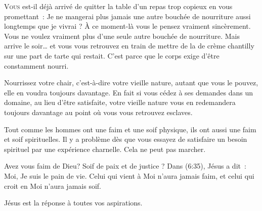 
\lettrine{V}{ous} est-il déjà arrivé de quitter la table d'un repas
 trop copieux en vous promettant~:
 \og Je ne mangerai plus jamais une autre bouchée de nourriture aussi longtemps
 que je vivrai \fg{} ?
 \`A ce moment-là vous le pensez vraiment sincèrement.
 Vous ne voulez vraiment plus d'une seule autre bouchée de nourriture.
 Mais arrive le soir\dots{} et vous vous retrouvez en train de mettre
 de la de crème chantilly sur une part de tarte qui restait.
 C'est parce que le corps exige d'être constamment nourri.


Nourrissez votre chair, c'est-à-dire votre vieille nature,
 autant que vous le pouvez, elle en voudra toujours davantage.
 En fait si vous cédez à ses demandes dans un domaine,
 au lieu d'être satisfaite, votre vieille nature vous en redemandera
 toujours davantage au point où vous vous retrouvez esclaves.

Tout comme les hommes ont une faim et une soif physique,
 ils ont aussi une faim et soif spirituelles.
 Il y a problème dès que vous essayez de satisfaire un besoin spirituel
 par une expérience charnelle. Cela ne peut pas marcher.

Avez vous faim de Dieu? Soif de paix et de justice ?
 Dans (6:35), Jésus a dit~:
 \og Moi, Je suis le pain de vie. Celui qui vient à Moi n'aura jamais faim,
 et celui qui croit en Moi n'aura jamais soif. \fg{}

Jésus est la réponse à toutes vos aspirations. 

\dvrule








